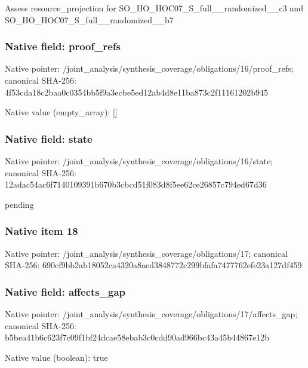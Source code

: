\documentclass[10pt,a4paper]{article}
\begin{document}
\begingroup\raggedright\sloppy Assess resource\_\allowbreak{}projection for SO\_\allowbreak{}HO\_\allowbreak{}HOC07\_\allowbreak{}S\_\allowbreak{}full\_\allowbreak{}\_\allowbreak{}randomized\_\allowbreak{}\_\allowbreak{}c3 and SO\_\allowbreak{}HO\_\allowbreak{}HOC07\_\allowbreak{}S\_\allowbreak{}full\_\allowbreak{}\_\allowbreak{}randomized\_\allowbreak{}\_\allowbreak{}b7\par\endgroup

\subsubsection{Native field: proof\_\allowbreak{}refs}
Native pointer: /joint\_\allowbreak{}analysis/synthesis\_\allowbreak{}coverage/obligations/16/proof\_\allowbreak{}refs; canonical SHA-256: 4f53cda18c2baa0c0354bb5f9a3ecbe5ed12ab4d8e11ba873c2f11161202b945

Native value (empty\_\allowbreak{}array): []

\subsubsection{Native field: state}
Native pointer: /joint\_\allowbreak{}analysis/synthesis\_\allowbreak{}coverage/obligations/16/state; canonical SHA-256: 12adac54ac6f7140109391b670b3cbcd51f083d8f5ee62ce26857c794ed67d36

\begingroup\raggedright\sloppy pending\par\endgroup

\subsubsection{Native item 18}
Native pointer: /joint\_\allowbreak{}analysis/synthesis\_\allowbreak{}coverage/obligations/17; canonical SHA-256: 690cf9bb2ab18052ca4320a8aed3848772c299bfafa7477762efe23a127df459

\subsubsection{Native field: affects\_\allowbreak{}gap}
Native pointer: /joint\_\allowbreak{}analysis/synthesis\_\allowbreak{}coverage/obligations/17/affects\_\allowbreak{}gap; canonical SHA-256: b5bea41b6c623f7c09f1bf24dcae58ebab3c0cdd90ad966bc43a45b44867e12b

Native value (boolean): true
\end{document}
